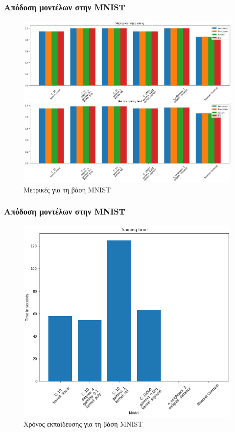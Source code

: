 \documentclass{beamer}
\begin{document}
\begin{frame}
\frametitle{Απόδοση μοντέλων στην MNIST}

\begin{figure}[H]
    \centering
    \includegraphics[width=0.8\linewidth]{figures/mnist/all_metrics.png}
    \caption{Μετρικές για τη βάση MNIST}
    \label{fig:mnist_metrics}
\end{figure}

\end{frame}

\begin{frame}
\frametitle{Απόδοση μοντέλων στην MNIST}

\begin{figure}[H]
    \centering
    \includegraphics[width=0.6\linewidth]{figures/mnist/training_time.png}
    \caption{Χρόνος εκπαίδευσης για τη βάση MNIST}
    \label{fig:mnist_training_times}
\end{figure}

\end{frame}
\end{document}
